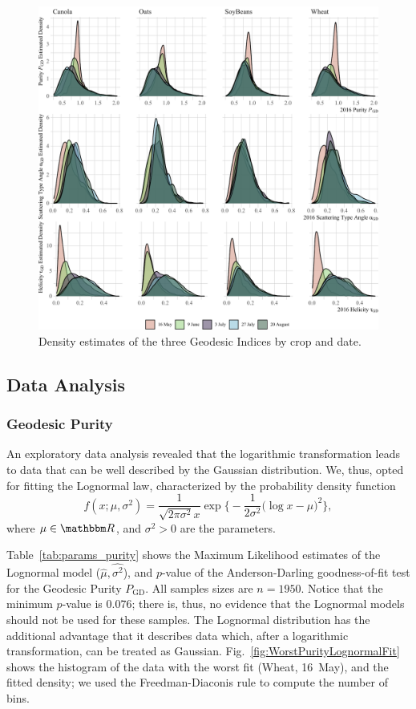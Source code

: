 \documentclass[journal]{IEEEtran}
\begin{document}
	\begin{figure}[htb]
		\centering
		\includegraphics[width=\linewidth]{Indexes}
		\caption{Density estimates of the three Geodesic Indices by crop and date.}\label{fig:AllIndexes}
	\end{figure}
	
	\subsection{Data Analysis}
	
	\subsubsection{Geodesic Purity}
	
	An exploratory data analysis revealed that the logarithmic transformation leads to data that can be well described by the Gaussian distribution.
	We, thus, opted for fitting the Lognormal law, characterized by the probability density function
	\begin{equation}
		f(x;\mu,\sigma^2) = \frac{1}{\sqrt{2\pi\sigma^2} x} \exp\Big\{
		-\frac1{2 \sigma^2}\big(\log x - \mu\big)^2
		\Big\},
	\end{equation}
	where $\mu\in\mathbbm R$, and $\sigma^2>0$ are the parameters.
	
	Table~\ref{tab:params_purity} shows the Maximum Likelihood estimates of the Lognormal model ($\widehat \mu,\widehat{\sigma^2}$), and $p$-value of the Anderson-Darling goodness-of-fit test for the Geodesic Purity $P_{\text{GD}}$.
	All samples sizes are $n=1950$.
	Notice that the minimum $p$-value is $0.076$; there is, thus, no evidence that the Lognormal models should not be used for these samples.
	The Lognormal distribution has the additional advantage that it describes data which, after a logarithmic transformation, can be treated as Gaussian.
	Fig.~\ref{fig:WorstPurityLognormalFit} shows the histogram of the data with the worst fit (Wheat, 16~May), and the fitted density; we used the Freedman-Diaconis rule to compute the number of bins.
	
\end{document}
